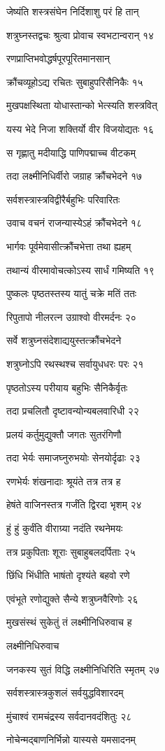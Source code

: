 जेष्यंति शस्त्रसंघेन निर्दिशाशु परं हि तान्

शत्रुघ्नस्तद्वचः श्रुत्वा प्रोवाच स्वभटान्वरान् १४

रणप्राप्तिभवोद्धर्षपूरपूरितमानसान्

क्रौंचव्यूहोऽद्य रचितः सुबाहुपरिसैनिकैः १५

मुखपक्षस्थिता योधास्तान्को भेत्स्यति शस्त्रवित्

यस्य भेदे निजा शक्तिर्यो वीर विजयोद्यतः १६

स गृह्णातु मदीयाद्धि पाणिपद्माच्च वीटकम्

तदा लक्ष्मीनिधिर्वीरो जग्राह क्रौंचभेदने १७

सर्वशस्त्रास्त्रविद्वीरैर्बहुभिः परिवारितः

उवाच वचनं राजन्यास्येऽहं क्रौंचभेदने १८

भार्गवः पूर्वमेवासीत्क्रौंचभेत्ता तथा ह्यहम्

तथान्यं वीरमावोचत्कोऽस्य सार्धं गमिष्यति १९

पुष्कलः पृष्ठतस्तस्य यातुं चक्रे मतिं ततः

रिपुतापो नीलरत्न उग्राश्वो वीरमर्दनः २०

सर्वे शत्रुघ्नसंदेशाद्ययुस्तत्क्रौंचभेदने

शत्रुघ्नोऽपि रथस्थश्च सर्वायुधधरः परः २१

पृष्ठतोऽस्य परीयाय बहुभिः सैनिकैर्वृतः

तदा प्रचलितौ दृष्टावन्योन्यबलवारिधी २२

प्रलयं कर्तुमुद्युक्तौ जगतः सुतरंगिणौ

तदा भेर्यः समाजघ्नुरुभयोः सेनयोर्दृढाः २३

रणभेर्यः शंखनादाः श्रूयंते तत्र तत्र ह

हेषंते वाजिनस्तत्र गर्जंति द्विरदा भृशम् २४

हुं हुं कुर्वंति वीराग्र्या नदंति रथनेमयः

तत्र प्रकुपिताः शूराः सुबाहुबलदर्पिताः २५

छिंधि भिंधीति भाषंतो दृश्यंते बहवो रणे

एवंभूते रणोद्युक्ते सैन्ये शत्रुघ्नवैरिणोः २६

मुखसंस्थं सुकेतुं तं लक्ष्मीनिधिरुवाच ह

लक्ष्मीनिधिरुवाच

जनकस्य सुतं विद्धि लक्ष्मीनिधिरिति स्मृतम् २७

सर्वशस्त्रास्त्रकुशलं सर्वयुद्धविशारदम्

मुंचाश्वं रामचंद्रस्य सर्वदानवदंशितुः २८

नोचेन्मद्बाणनिर्भिन्नो यास्यसे यमसादनम्

